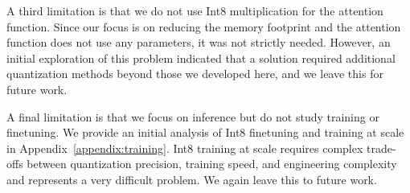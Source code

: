 \documentclass{article}
\begin{document}
A third limitation is that we do not use Int8 multiplication for the attention function. Since our focus is on reducing the memory footprint and the attention function does not use any parameters, it was not strictly needed. However, an initial exploration of this problem indicated that a solution required additional quantization methods beyond those we developed here, and we leave this for future work.

A final limitation is that we focus on inference but do not study training or finetuning. We provide an initial analysis of Int8 finetuning and training at scale in Appendix~\ref{appendix:training}. Int8 training at scale requires complex trade-offs between quantization precision, training speed, and engineering complexity and represents a very difficult problem. We again leave this to future work. 

\begin{table}[h]
\centering
\caption{Different hardware setups and which methods can be run in 16-bit vs. 8-bit precision. We can see that our 8-bit method makes many models accessible that were not accessible before, in particular, OPT-175B/BLOOM.}
\label{tbl:memsavings}
\end{table}
\end{document}
